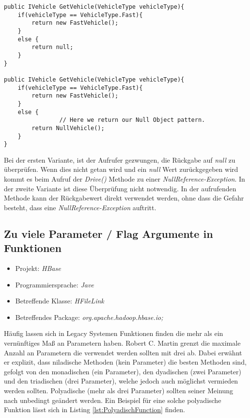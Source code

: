\begin{lstlisting}[language={[Sharp]C}, caption=Anwendung des Null Object pattern, label=lst:UsageNullObjectPattern]
public IVehicle GetVehicle(VehicleType vehicleType){
    if(vehicleType == VehicleType.Fast){
        return new FastVehicle();
    }
    else {
        return null; 
    }
}

public IVehicle GetVehicle(VehicleType vehicleType){
    if(vehicleType == VehicleType.Fast){
        return new FastVehicle();
    }
    else {
				// Here we return our Null Object pattern.
        return NullVehicle();
    }
}
\end{lstlisting}

\SuperPar Bei der ersten Variante, ist der Aufrufer gezwungen, die Rückgabe auf \textit{null} zu überprüfen. Wenn dies nicht getan wird und ein \textit{null} Wert zurückgegeben wird kommt es beim Aufruf der \textit{Drive()} Methode zu einer \textit{NullReference-Exception}. In der zweite Variante ist diese Überprüfung nicht notwendig. In der aufrufenden Methode kann der Rückgabewert direkt verwendet werden, ohne dass die Gefahr besteht, dass eine \textit{NullReference-Exception} auftritt.

\subsection{Zu viele Parameter / Flag Argumente in Funktionen}
\begin{itemize}
	\item Projekt: \textit{HBase}
	\item Programmiersprache: \textit{Jave}
	\item Betreffende Klasse: \textit{HFileLink}
	\item Betreffendes Package: \textit{org.apache.hadoop.hbase.io;}
\end{itemize}

\SuperPar Häufig lassen sich in Legacy Systemen Funktionen finden die mehr als ein vernünftiges Maß an Parametern haben. Robert C. Martin grenzt die maximale Anzahl an Parametern die verwendet werden sollten mit drei ab. Dabei erwähnt er explizit, dass niladische Methoden (kein Parameter) die besten Methoden sind, gefolgt von den monadischen (ein Parameter), den dyadischen (zwei Parameter) und den triadischen (drei Parameter), welche jedoch auch möglichst vermieden werden sollten. Polyadische (mehr als drei Parameter) sollten seiner Meinung nach unbedingt geändert werden. Ein Beispiel für eine solche polyadische Funktion lässt sich in Listing
 \ref{lst:PolyadischFunction} finden.

